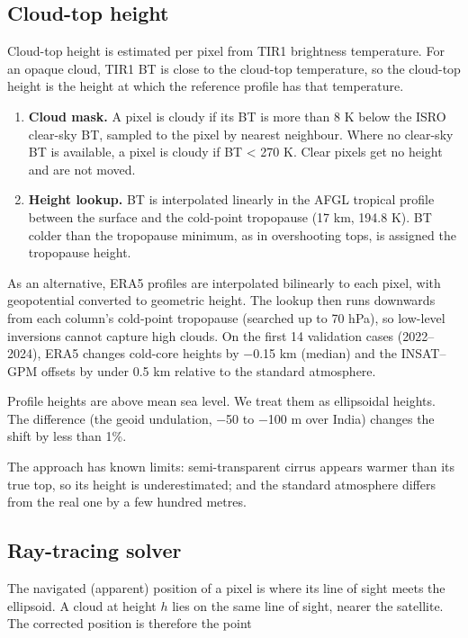 \subsection{Cloud-top height}\label{sec:3.2}

Cloud-top height is estimated per pixel from TIR1 brightness temperature. For an opaque cloud, TIR1 BT is close to the cloud-top temperature, so the cloud-top height is the height at which the reference profile has that temperature.

\begin{enumerate}
\def\labelenumi{\arabic{enumi}.}
\tightlist
\item
  \textbf{Cloud mask.} A pixel is cloudy if its BT is more than 8 K below the ISRO clear-sky BT, sampled to the pixel by nearest neighbour. Where no clear-sky BT is available, a pixel is cloudy if BT \textless{} 270 K. Clear pixels get no height and are not moved.
\item
  \textbf{Height lookup.} BT is interpolated linearly in the AFGL tropical profile between the surface and the cold-point tropopause (17 km, 194.8 K). BT colder than the tropopause minimum, as in overshooting tops, is assigned the tropopause height.
\end{enumerate}

As an alternative, ERA5 profiles are interpolated bilinearly to each pixel, with geopotential converted to geometric height. The lookup then runs downwards from each column's cold-point tropopause (searched up to 70 hPa), so low-level inversions cannot capture high clouds. On the first 14 validation cases (2022--2024), ERA5 changes cold-core heights by −0.15 km (median) and the INSAT--GPM offsets by under 0.5 km relative to the standard atmosphere.

Profile heights are above mean sea level. We treat them as ellipsoidal heights. The difference (the geoid undulation, −50 to −100 m over India) changes the shift by less than 1\%.

The approach has known limits: semi-transparent cirrus appears warmer than its true top, so its height is underestimated; and the standard atmosphere differs from the real one by a few hundred metres.

\subsection{Ray-tracing solver}\label{sec:3.3}

The navigated (apparent) position of a pixel is where its line of sight meets the ellipsoid. A cloud at height \(h\) lies on the same line of sight, nearer the satellite. The corrected position is therefore the point

